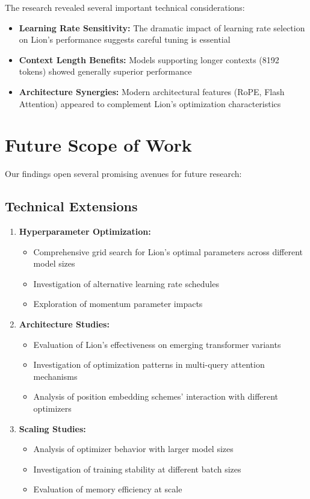 The research revealed several important technical considerations:

\begin{itemize}
    \item \textbf{Learning Rate Sensitivity:} The dramatic impact of learning rate selection on Lion's performance suggests careful tuning is essential
    \item \textbf{Context Length Benefits:} Models supporting longer contexts (8192 tokens) showed generally superior performance
    \item \textbf{Architecture Synergies:} Modern architectural features (RoPE, Flash Attention) appeared to complement Lion's optimization characteristics
\end{itemize}

\section{Future Scope of Work}

Our findings open several promising avenues for future research:

\subsection{Technical Extensions}

\begin{enumerate}
    \item \textbf{Hyperparameter Optimization:}
    \begin{itemize}
        \item Comprehensive grid search for Lion's optimal parameters across different model sizes
        \item Investigation of alternative learning rate schedules
        \item Exploration of momentum parameter impacts
    \end{itemize}

    \item \textbf{Architecture Studies:}
    \begin{itemize}
        \item Evaluation of Lion's effectiveness on emerging transformer variants
        \item Investigation of optimization patterns in multi-query attention mechanisms
        \item Analysis of position embedding schemes' interaction with different optimizers
    \end{itemize}

    \item \textbf{Scaling Studies:}
    \begin{itemize}
        \item Analysis of optimizer behavior with larger model sizes
        \item Investigation of training stability at different batch sizes
        \item Evaluation of memory efficiency at scale
    \end{itemize}
\end{enumerate}

